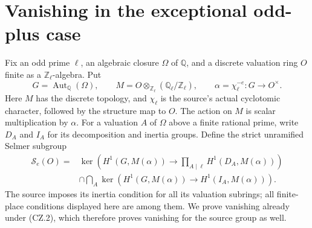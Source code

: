 \section{Vanishing in the exceptional odd-plus case}
\label{sec:count-z-closure}


Fix an odd prime $\ell$, an algebraic closure $\Omega$ of
$\mathbb Q$, and a discrete valuation ring $O$ finite as a
$\mathbb Z_\ell$-algebra.  Put
\[
 G=\operatorname{Aut}_{\mathbb Q}(\Omega),\qquad
 M=O\otimes_{\mathbb Z_\ell}(\mathbb Q_\ell/\mathbb Z_\ell),
 \qquad \alpha=\chi_\ell^{-e}:G\longrightarrow O^\times.
 \tag{CZ.1}
\]
Here $M$ has the discrete topology, and $\chi_\ell$ is the
source's actual cyclotomic character, followed by the structure map
to $O$.  The action on $M$ is scalar multiplication by $\alpha$.
For a valuation $A$ of $\Omega$ above a finite rational prime,
write $D_A$ and $I_A$ for its decomposition and inertia groups.
Define the strict unramified Selmer subgroup
\[
 \begin{split}
 \mathcal S_e(O)={}&
 \ker\!\left(H^1(G,M(\alpha))\longrightarrow
     \prod_{A\mid\ell}H^1(D_A,M(\alpha))\right)
 \\
 &\cap\bigcap_A\ker\!\left(H^1(G,M(\alpha))
                       \longrightarrow H^1(I_A,M(\alpha))\right).
 \end{split}
 \tag{CZ.2}
\]
The source imposes its inertia condition for all its valuation
subrings; all finite-place conditions displayed here are among them.
We prove vanishing already under (CZ.2), which therefore proves
vanishing for the source group as well.

